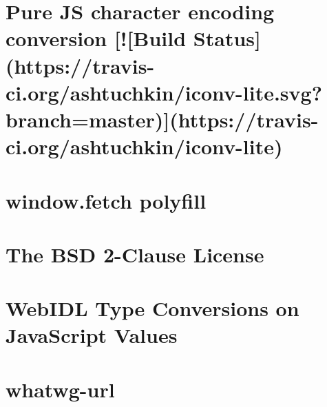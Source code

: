 \documentclass[twoside]{book}
\newcommand{\+}{\discretionary{\mbox{\scriptsize$\hookleftarrow$}}{}{}}
\begin{document}
\chapter{Pure JS character encoding conversion \mbox{[}!\mbox{[}Build Status\mbox{]}(https\+://travis-\/ci.org/ashtuchkin/iconv-\/lite.svg?branch=master)\mbox{]}(https\+://travis-\/ci.org/ashtuchkin/iconv-\/lite)}
\label{md__c_1_workspace_demo_src_main_script_node_modules_whatwg-encoding_node_modules_iconv-lite__r_e_a_d_m_e}

\chapter{window.\+fetch polyfill}
\label{md__c_1_workspace_demo_src_main_script_node_modules_whatwg-fetch__r_e_a_d_m_e}

\chapter{The B\+SD 2-\/\+Clause License}
\label{md__c_1_workspace_demo_src_main_script_node_modules_whatwg-url_node_modules_webidl-conversions__l_i_c_e_n_s_e}

\chapter{Web\+I\+DL Type Conversions on Java\+Script Values}
\label{md__c_1_workspace_demo_src_main_script_node_modules_whatwg-url_node_modules_webidl-conversions__r_e_a_d_m_e}

\chapter{whatwg-\/url}
\label{md__c_1_workspace_demo_src_main_script_node_modules_whatwg-url__r_e_a_d_m_e}

\end{document}
